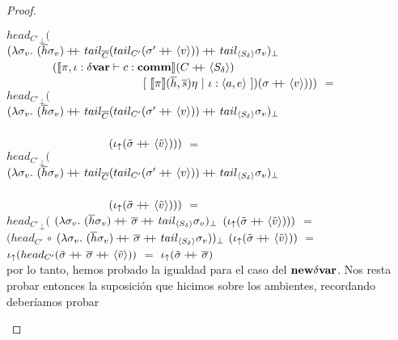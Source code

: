 \begin{proof}
\begin{itemize}
\begin{itemize}
${head_{C'}}_{\bot}($\\
$(\lambda \sigma_{v} . \  
				(\overline{h} \sigma_{v}) +\kern-1.3ex+\kern0.8ex 
				tail_{\overline{C}}(tail_{C'}(\sigma' +\kern-1.3ex+\kern0.8ex \langle v \rangle)) +\kern-1.3ex+\kern0.8ex
				tail_{\langle S_\delta \rangle}\sigma_{v})_{\bot}$ \\
\indent \ \ \ \ \ \ \ \
$(\llbracket \pi,\iota:\delta \textbf{var} \vdash c : \textbf{comm} \rrbracket(C +\kern-1.3ex+\kern0.8ex \langle S_\delta \rangle)$\\
\indent \ \ \ \ \ \ \ \ \ \ \ \ \ \ \ \ \ \ \ \ \ \ \ \
$[ \ \semBrcks{\pi}(\hover,\sover)\eta \ | \ \iota:\lrangles{a,e} \ ]) 
(\sigma \concat \lrangles{v})))$ $=$\\
${head_{C'}}_{\bot}($\\
$(\lambda \sigma_{v} . \
				(\overline{h} \sigma_{v}) +\kern-1.3ex+\kern0.8ex 
				tail_{\overline{C}}(tail_{C'}(\sigma' +\kern-1.3ex+\kern0.8ex \langle v \rangle)) +\kern-1.3ex+\kern0.8ex
				tail_{\langle S_\delta \rangle}\sigma_{v})_{\bot}$ \\
\indent \ \ \ \ \ \ \ \ \ \ \ \ \ \ \ \ \ \ \ \ \ \ \ \ \ \ \ \ \ \ \ \ \ \ \ \ \ \ \ \
 \ \ \ \ \ \ \ \ \ \ \ \ \ \ \ \ \ \ \ \ \ \ \ \ \ \ \ \ \ \ \ \ \ \ \ \ \ \ \ \
  \ \ \ \ \ \ \ \ \ \
$(\iota_{\uparrow} (\tilde{\sigma} +\kern-1.3ex+\kern0.8ex \langle \tilde{v} \rangle)))$ $=$\\
${head_{C'}}_{\bot}($\\
$(\lambda \sigma_{v} . \
				(\overline{h} \sigma_{v}) +\kern-1.3ex+\kern0.8ex 
				tail_{\overline{C}}(tail_{C'}(\sigma' +\kern-1.3ex+\kern0.8ex \langle v \rangle)) +\kern-1.3ex+\kern0.8ex
				tail_{\langle S_\delta \rangle}\sigma_{v})_{\bot}$ \\
\indent \ \ \ \ \ \ \ \ \ \ \ \ \ \ \ \ \ \ \ \ \ \ \ \ \ \ \ \ \ \ \ \ \ \ \ \ \ \ \ \
 \ \ \ \ \ \ \ \ \ \ \ \ \ \ \ \ \ \ \ \ \ \ \ \ \ \ \ \ \ \ \ \ \ \ \ \ \ \ \ \
  \ \ \ \ \ \ \ \ \ \
$(\iota_{\uparrow} (\tilde{\sigma} +\kern-1.3ex+\kern0.8ex \langle \tilde{v} \rangle)))$ $=$\\
${head_{C'}}_{\bot}($
$(\lambda \sigma_{v} . \
				(\overline{h} \sigma_{v}) +\kern-1.3ex+\kern0.8ex 
				\overline{\sigma} +\kern-1.3ex+\kern0.8ex
				tail_{\langle S_\delta \rangle}\sigma_{v})_{\bot}$
$(\iota_{\uparrow} (\tilde{\sigma} +\kern-1.3ex+\kern0.8ex \langle \tilde{v} \rangle)))$ $=$\\
$(head_{C'}$
$\circ$
$(\lambda \sigma_{v} . \
				(\overline{h} \sigma_{v}) +\kern-1.3ex+\kern0.8ex 
				\overline{\sigma} +\kern-1.3ex+\kern0.8ex
				tail_{\langle S_\delta \rangle}\sigma_{v}))_{\bot}$
$(\iota_{\uparrow} (\tilde{\sigma} +\kern-1.3ex+\kern0.8ex \langle \tilde{v} \rangle))$ $=$\\
$\iota_{\uparrow} (head_{C'} (\tilde{\sigma} +\kern-1.3ex+\kern0.8ex \overline{\sigma} +\kern-1.3ex+\kern0.8ex \langle \tilde{v} \rangle))$ $=$
$\iota_{\uparrow} (\tilde{\sigma} +\kern-1.3ex+\kern0.8ex \overline{\sigma})$\\

por lo tanto, hemos probado la igualdad para el caso del $\textbf{new} \delta \textbf{var}$. Nos resta 
probar entonces la suposici\'on que hicimos sobre los ambientes, recordando deber\'iamos
probar\\


\end{itemize}
\end{itemize}
\end{proof}
